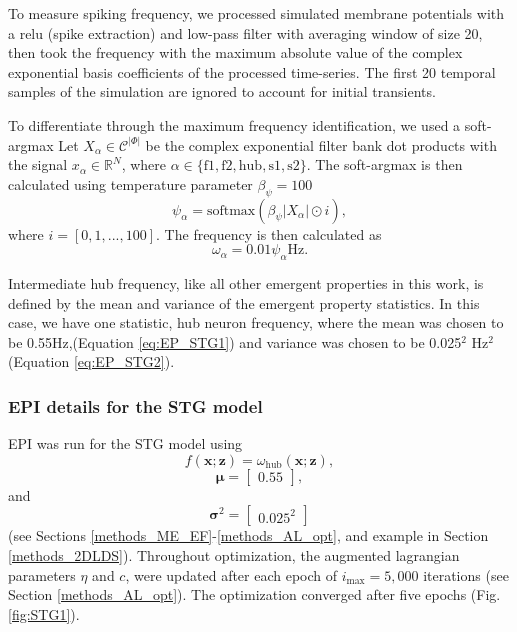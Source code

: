 \documentclass[11pt]{article}
\begin{document}
To measure spiking frequency, we processed simulated membrane potentials with a relu (spike extraction) and low-pass filter with averaging window of size 20, then took the frequency with the maximum absolute value of the complex exponential basis coefficients of the processed time-series.  The first 20 temporal samples of the simulation are ignored to account for initial transients.

To differentiate through the maximum frequency identification, we used a soft-argmax
Let $X_\alpha \in \mathcal{C}^{|\Phi|}$ be the complex exponential filter bank dot products with the signal $x_\alpha \in \mathbb{R}^{N}$, where $\alpha \in \{ \text{f1}, \text{f2}, \text{hub}, \text{s1}, \text{s2} \}$.  
The soft-argmax is then calculated using temperature parameter $\beta_{\psi}=100$
\begin{equation}
\psi_\alpha = \text{softmax}(\beta_{\psi}|X_\alpha|\odot i),
\end{equation}
where $i = [0, 1, ..., 100]$.
The frequency is then calculated as 
\begin{equation}
\omega_\alpha = 0.01\psi_\alpha \text{Hz}.
\end{equation}

Intermediate hub frequency, like all other emergent properties in this work, is defined by the mean and variance of the emergent property statistics.
In this case, we have one statistic, hub neuron frequency, where the mean was chosen to be 0.55Hz,(Equation \ref{eq:EP_STG1}) and variance was chosen to be 0.025$^2$ Hz$^2$ (Equation \ref{eq:EP_STG2}).

\subsubsection{EPI details for the STG model} \label{methods_stg_epi}
EPI was run for the STG model using
\begin{equation}
f(\mathbf{x}; \mathbf{z}) = \omega_{\text{hub}}(\mathbf{x}; \mathbf{z}),
\end{equation}
\begin{equation}
\bm{\mu} = \begin{bmatrix} 0.55 \end{bmatrix},
\end{equation}
and
\begin{equation}
\bm{\sigma}^2 = \begin{bmatrix} 0.025^2 \end{bmatrix}
\end{equation}
(see Sections \ref{methods_ME_EF}-\ref{methods_AL_opt}, and example in Section \ref{methods_2DLDS}).
Throughout optimization, the augmented lagrangian parameters $\eta$ and $c$, were updated after each epoch of $i_{\text{max}} = 5,000$ iterations (see Section \ref{methods_AL_opt}).  
The optimization converged after five epochs (Fig. \ref{fig:STG1}).
\end{document}
